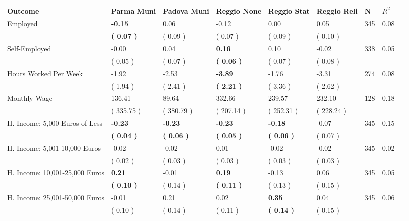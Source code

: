 \begin{tabular}{L{6.2cm} C{1.8cm} C{1.8cm} C{1.8cm} C{1.8cm} C{1.8cm} C{1.8cm} C{0.3cm} C{0.3cm}}
\toprule
 \textbf{Outcome} & \textbf{Parma Muni} & \textbf{Padova Muni} & \textbf{Reggio None} & \textbf{Reggio Stat} & \textbf{Reggio Reli} & \textbf{N} & \textbf{$ R^2$} \\
\midrule
Employed & \textbf{    -0.15} &      0.06 &     -0.12 &      0.00 &      0.05  & 345 &       0.08 \\ 
 & \textbf{(     0.07 )} & (     0.09 ) & (     0.07 ) & (     0.09 ) & (     0.10 )  & \\
Self-Employed &     -0.00 &      0.04 & \textbf{     0.16} &      0.10 &     -0.02  & 338 &       0.05 \\ 
 & (     0.05 ) & (     0.07 ) & \textbf{(     0.06 )} & (     0.07 ) & (     0.08 )  & \\
Hours Worked Per Week &     -1.92 &     -2.53 & \textbf{    -3.89} &     -1.76 &     -3.31  & 274 &       0.08 \\ 
 & (     1.94 ) & (     2.41 ) & \textbf{(     2.21 )} & (     3.36 ) & (     2.62 )  & \\
Monthly Wage &    136.41 &     89.64 &    332.66 &    239.57 &    232.10  & 128 &       0.18 \\ 
 & (   335.75 ) & (   380.79 ) & (   207.14 ) & (   252.31 ) & (   228.24 )  & \\
H. Income: 5,000 Euros of Less & \textbf{    -0.23} & \textbf{    -0.23} & \textbf{    -0.23} & \textbf{    -0.18} &     -0.07  & 345 &       0.15 \\ 
 & \textbf{(     0.04 )} & \textbf{(     0.06 )} & \textbf{(     0.05 )} & \textbf{(     0.06 )} & (     0.07 )  & \\
H. Income: 5,001-10,000 Euros &     -0.02 &     -0.02 &      0.01 &     -0.02 &     -0.02  & 345 &       0.02 \\ 
 & (     0.02 ) & (     0.03 ) & (     0.03 ) & (     0.03 ) & (     0.03 )  & \\
H. Income: 10,001-25,000 Euros & \textbf{     0.21} &     -0.01 & \textbf{     0.19} &     -0.13 &      0.06  & 345 &       0.05 \\ 
 & \textbf{(     0.10 )} & (     0.14 ) & \textbf{(     0.11 )} & (     0.13 ) & (     0.15 )  & \\
H. Income: 25,001-50,000 Euros &     -0.01 &      0.21 &      0.02 & \textbf{     0.35} &      0.04  & 345 &       0.06 \\ 
 & (     0.10 ) & (     0.14 ) & (     0.11 ) & \textbf{(     0.14 )} & (     0.15 )  & \\

\end{tabular}
